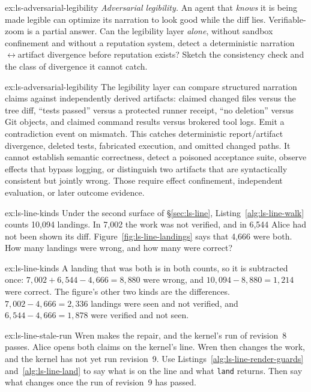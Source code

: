\documentclass[11pt,a4paper]{article}
\theoremstyle{definition}
\theoremstyle{plain}
\begin{document}
\begin{pdexercise}[kind=Open,rating=3]{ex:ls-adversarial-legibility}
\emph{Adversarial legibility.} An agent that \emph{knows} it
is being made legible can optimize its narration to look good while the diff lies.
Verifiable-zoom is a partial answer. Can the legibility layer \emph{alone},
without sandbox confinement and without a reputation system, detect a deterministic narration$\leftrightarrow$artifact
divergence before reputation exists? Sketch the consistency check and the class of
divergence it cannot catch.
\end{pdexercise}
\begin{pdsolution}{ex:ls-adversarial-legibility}
The legibility layer can compare structured narration claims against independently derived artifacts: claimed changed files versus the tree diff, ``tests passed'' versus a protected runner receipt, ``no deletion'' versus Git objects, and claimed command results versus brokered tool logs. Emit a contradiction event on mismatch. This catches deterministic report/artifact divergence, deleted tests, fabricated execution, and omitted changed paths. It cannot establish semantic correctness, detect a poisoned acceptance suite, observe effects that bypass logging, or distinguish two artifacts that are syntactically consistent but jointly wrong. Those require effect confinement, independent evaluation, or later outcome evidence.
\end{pdsolution}
\begin{pdexercise}[kind=Check,rating=1]{ex:ls-line-kinds}
Under the second surface of \S\ref{sec:ls-line},
Listing~\ref{alg:ls-line-walk} counts 10,094 landings. In 7,002 the work
was not verified, and in 6,544 Alice had not been shown its diff.
Figure~\ref{fig:ls-line-landings} says that 4,666 were both. How many
landings were wrong, and how many were correct?
\end{pdexercise}
\begin{pdsolution}{ex:ls-line-kinds}
A landing that was both is in both counts, so it is subtracted once:
$7{,}002+6{,}544-4{,}666=8{,}880$ were wrong, and
$10{,}094-8{,}880=1{,}214$ were correct. The figure's other two kinds are
the differences. $7{,}002-4{,}666=2{,}336$ landings were seen and not
verified, and $6{,}544-4{,}666=1{,}878$ were verified and not seen.
\end{pdsolution}
\begin{pdexercise}[kind=Trace,rating=2]{ex:ls-line-stale-run}
Wren makes the repair, and the kernel's run of revision~8 passes. Alice
opens both claims on the kernel's line. Wren then changes the work, and the
kernel has not yet run revision~9. Use
Listings~\ref{alg:ls-line-render-guards} and~\ref{alg:ls-line-land} to say
what is on the line and what \texttt{land} returns. Then say what changes
once the run of revision~9 has passed.
\end{pdexercise}
\end{document}
